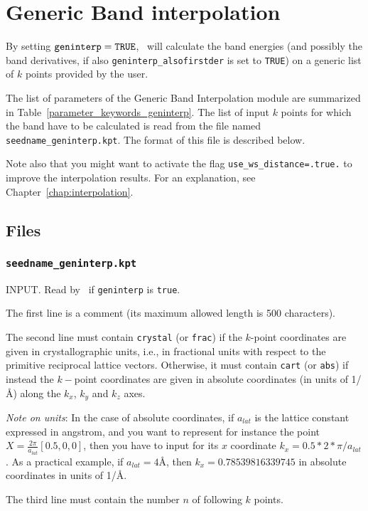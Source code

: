 \chapter{Generic Band interpolation}\label{ch:geninterp}

By setting $\verb#geninterp#=\verb#TRUE#$, \postw\ will calculate the
band energies (and possibly the band derivatives, if also
\verb#geninterp_alsofirstder# is set to \verb#TRUE#) on a generic list
of $k$ points provided by the user.

The list of parameters of the Generic Band Interpolation module are
summarized in Table~\ref{parameter_keywords_geninterp}. 
The list of input $k$ points for which the band have to be calculated
is read from the file named {\tt seedname\_geninterp.kpt}. The format
of this file is
described below. 

Note also that you might want to activate the flag 
{\tt use\_ws\_distance=.true.}
to improve the interpolation results. For an explanation, see 
Chapter~\ref{chap:interpolation}.

\section{Files}
\subsection{{\tt seedname\_geninterp.kpt}}
INPUT. Read by \postw\ if {\tt geninterp} is \verb#true#. 

The first line is a comment (its maximum allowed length is 500
characters).

The second line must contain \verb#crystal# (or \verb#frac#) if the
$k$-point coordinates are given in crystallographic units,
i.e., in fractional units with respect to the primitive reciprocal
lattice vectors.
Otherwise, it must contain \verb#cart# (or \verb#abs#) if instead the
$k-$point coordinates are given in absolute 
coordinates (in units of 1/\AA) along the $k_x$, $k_y$ and $k_z$
axes.

\emph{Note on units}: In the case of absolute coordinates, 
if $a_{lat}$ is the lattice constant expressed in angstrom,
and you want to represent for instance the point
$X=\frac {2\pi}{a_{lat}} [0.5, 0, 0]$, then you have to input for its $x$ coordinate
$k_x = 0.5 * 2 * \pi / a_{lat}$. As a practical example, if
$a_{lat}=4$\AA, then $k_x = 0.78539816339745$ in 
absolute coordinates in units of 1/\AA.

The third line must contain the number $n$ of following $k$ points.

